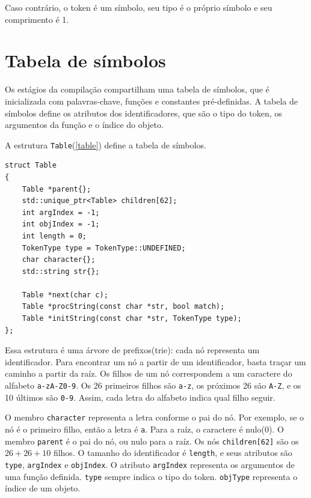Caso contrário, o token é um símbolo, seu tipo é o próprio símbolo
e seu comprimento é 1.

\section{Tabela de símbolos}
Os estágios da compilação compartilham uma tabela de símbolos,
que é inicializada com palavras-chave,
funções e constantes pré-definidas.
A tabela de símbolos define os atributos dos identificadores,
que são o tipo do token, os argumentos da função e o índice do objeto.

A estrutura \texttt{Table}(\ref{table}) define a tabela de símbolos.

\begin{lstlisting}[caption=Tabela de símbolos, label=table]
struct Table
{
    Table *parent{};
    std::unique_ptr<Table> children[62];
    int argIndex = -1;
    int objIndex = -1;
    int length = 0;
    TokenType type = TokenType::UNDEFINED;
    char character{};
    std::string str{};

    Table *next(char c);
    Table *procString(const char *str, bool match);
    Table *initString(const char *str, TokenType type);
};
\end{lstlisting}

Essa estrutura é uma árvore de prefixos(trie):
cada nó representa um identificador. Para encontrar um nó a partir
de um identificador, basta traçar um caminho a partir da raíz.
Os filhos de um nó correspondem a um caractere do alfabeto \texttt{a-zA-Z0-9}.
Os 26 primeiros filhos são \texttt{a-z}, os próximos 26 são \texttt{A-Z},
e os 10 últimos são \texttt{0-9}.
Assim, cada letra do alfabeto indica qual filho seguir.

O membro \texttt{character} representa a letra conforme o pai do nó.
Por exemplo, se o nó é o primeiro filho, então a letra é \texttt{a}.
Para a raíz, o caractere é nulo(0).
O membro \texttt{parent} é o pai do nó, ou nulo para a raíz.
Os nós \texttt{children[62]} são os $26+26+10$ filhos.
O tamanho do identificador é \texttt{length}, e seus atributos são
\texttt{type}, \texttt{argIndex} e \texttt{objIndex}.
O atributo \texttt{argIndex} representa os argumentos de uma função definida.
\texttt{type} sempre indica o tipo do token.
\texttt{objType} representa o índice de um objeto.

